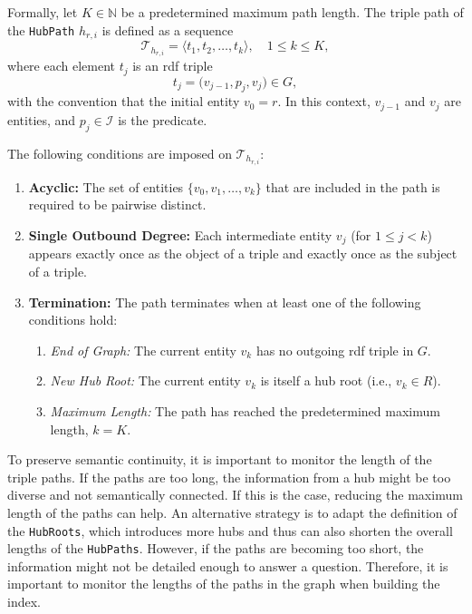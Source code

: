 Formally, let \(K \in \mathbb{N}\) be a predetermined maximum path length. The triple path of the \texttt{HubPath} $h_{r,i}$ is defined as a sequence
\[
\mathcal{T}_{h_{r,i}} = \langle t_1, t_2, \dots, t_k \rangle, \quad 1 \le k \le K,
\]
where each element \(t_j\) is an \gls{rdf} triple
\[
t_j = \bigl( v_{j-1}, p_j, v_j \bigr) \in G,
\]
with the convention that the initial entity \(v_0 = r\). In this context, \(v_{j-1}\) and \(v_j\) are entities, and \(p_j \in \mathcal{I}\) is the predicate. 

The following conditions are imposed on \(\mathcal{T}_{h_{r,i}}\):
\begin{enumerate}
  \item \textbf{Acyclic:} The set of entities \(\{v_0, v_1, \dots, v_k\}\) that are included in the path is required to be pairwise distinct. 
  \item \textbf{Single Outbound Degree:} Each intermediate entity \(v_j\) (for \(1 \le j < k\)) appears exactly once as the object of a triple and exactly once as the subject of a triple.
  \item \textbf{Termination:} The path terminates when at least one of the following conditions hold:
  \begin{enumerate}
    \item \emph{End of Graph:} The current entity \(v_k\) has no outgoing \gls{rdf} triple in \(G\).
    \item \emph{New Hub Root:} The current entity \(v_k\) is itself a hub root (i.e., \(v_k \in R\)).
    \item \emph{Maximum Length:} The path has reached the predetermined maximum length, \(k = K\).
  \end{enumerate}
\end{enumerate}

To preserve semantic continuity, it is important to monitor the length of the triple paths. If the paths are too long, the information from a hub might be too diverse and not semantically connected. If this is the case, reducing the maximum length of the paths can help. An alternative strategy is to adapt the definition of the \texttt{HubRoots}, which introduces more hubs and thus can also shorten the overall lengths of the \texttt{HubPaths}. However, if the paths are becoming too short, the information might not be detailed enough to answer a question. Therefore, it is important to monitor the lengths of the paths in the graph when building the index.

